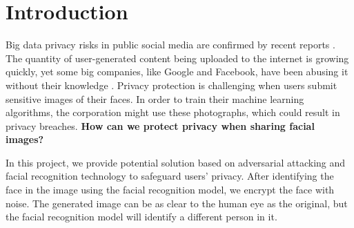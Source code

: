 \section{Introduction}

Big data privacy risks in public social media are confirmed by recent reports \cite{6227909}. The quantity of user-generated content being uploaded to the internet is growing quickly, yet some big companies, like Google and Facebook, have been abusing it without their knowledge \cite{10.1093/idpl/ipw026}. Privacy protection is challenging when users submit sensitive images of their faces. In order to train their machine learning algorithms, the corporation might use these photographs, which could result in privacy breaches. \textbf{How can we protect privacy when sharing facial images?}

In this project, we provide potential solution based on adversarial attacking and facial recognition technology to safeguard users' privacy. After identifying the face in the image using the facial recognition model, we encrypt the face with noise. The generated image can be as clear to the human eye as the original, but the facial recognition model will identify a different person in it.
